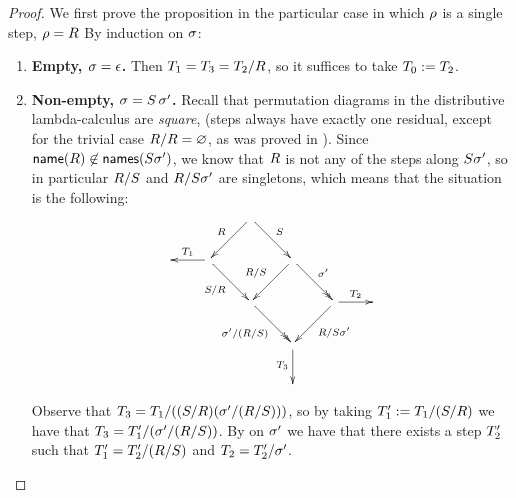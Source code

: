 \begin{proof}
We first prove the proposition in the particular case in which $\rho$ is a single step, \ie $\rho = R$
By induction on $\sigma$:
\begin{enumerate}
\item {\bf Empty, $\sigma = \epsilon$.}
  Then $T_1 = T_3 = T_2/R$,
  so it suffices to take $T_0 := T_2$.
\item {\bf Non-empty, $\sigma = S\,\sigma'$.}
  Recall that permutation diagrams in the distributive lambda-calculus are {\em square},
  (\ie steps always have exactly one residual, except for the trivial case $R/R = \varnothing$,
  as was proved in ).
  Since $\mathsf{name}(R) \not\in \mathsf{names}(S\sigma')$,
  we know that $R$ is not any of the steps along $S\sigma'$,
  so in particular $R/S$ and $R/S\sigma'$
  are singletons, which means that the situation is the following:
  \[
    \xymatrix{
      &
      &
        \ar[ld]_{\redex} \ar[rd]^{\redextwo}
      &
    \\
      &
      \ar[l]_{\redexthree_1}
      \ar[rd]_{\redextwo/\redex}
      &
      &
        \ar[ld]_-{\redex/\redextwo} \ar@{->>}[rd]^{\redseqtwo'}
      & 
      &
    \\
      &
      &
        \ar@{->>}[rd]_-{\redseqtwo'/(\redex/\redextwo)}
      &
      &
        \ar@{->}[dl]^{\redex/\redextwo\redseqtwo'}
        \ar[r]^{\redexthree_2}
      &
    \\
      &
      &
      &
      \ar[d]_{\redexthree_3}
      &
    \\
      &
      &
      &
    }
  \]
  Observe that $T_3 = T_1/((S/R)(\sigma'/(R/S)))$,
  so by taking $T'_1 := T_1/(S/R)$
  we have that $T_3 = T'_1/(\sigma'/(R/S))$.
  By \ih on $\sigma'$ we have that
  there exists a step $T'_2$ such that
  $T'_1 = T'_2/(R/S)$ and
  $T_2 = T'_2/\sigma'$.


\end{enumerate}
\end{proof}
